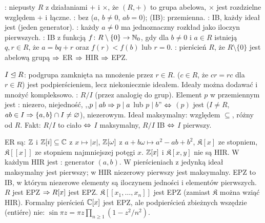 :  niepusty $R$ z działaniami $+$ i $\times$, że $(R,+)$ to grupa abelowa, $\times$ jest rozdzielne względem $+$ i łączne.
: bez  ($a$, $b \neq 0$, $ab = 0$);  (IB): przemienna.
: IB, każdy ideał jest  (jeden generator).
: każdy $a \neq 0$ ma jednoznaczny rozkład jako iloczyn pierwszych.
: IB z funkcją $f \colon R \setminus \{0\} \to \mathbb N_0$, gdy dla $b \neq 0$ i $a \in R$ istnieją $q, r \in R$, że $a = bq+r$ oraz $f(r) < f(b)$ lub $r = 0$.
: pierścień $R$, że $R \setminus \{0\}$ jest abelową grupą $\Rightarrow$ ER $\Rightarrow$ HIR $\Rightarrow$ EPZ.

 $I \trianglelefteq R$: podgrupa zamknięta na mnożenie przez $r \in R$.
 ($c \in R$, że $cr = rc$ dla $r \in R$) jest podpierścieniem, lecz niekoniecznie ideałem.
Ideały można dodawać i mnożyć kompleksowo.
: $R/I$ (przez analogię do grup).
Element $p$ w przemiennym jest : niezero, niejedność, ,,$p \mid ab \Rightarrow p \mid a$ lub $p \mid b$'' $\Leftrightarrow$ $(p)$ jest  ($I \neq R$, $ab \in I \Rightarrow \{a,b\} \cap I \neq \varnothing$), niezerowym.
Ideał maksymalny: względem $\subseteq$, różny od $R$.
Fakt: $R/I$ to ciało $\Leftrightarrow$ $I$ maksymalny, $R/I$ IB $\Leftrightarrow$ $I$ pierwszy.

ER są: $\mathbb{Z}$ i $\mathbb{Z}[i] \subseteq \mathbb{C}$ z $x \mapsto |x|$, $\mathbb{Z}[\omega]$ z $a + b\omega \mapsto a^2-ab+b^2$, $\mathfrak K[x]$ ze stopniem, $\mathfrak K[[x]]$ ze stopniem najmniejszej potęgi $x$. 
$\mathbb{Z}[x]$ i $\mathfrak K[x,y]$ nie są HIR.
W każdym HIR jest : generator $(a,b)$.
W pierścieniach z jedynką ideał maksymalny jest pierwszy; w HIR niezerowy pierwszy jest maksymalny.
EPZ to IB, w którym niezerowe elementy są iloczynem jedności i elementów pierwszych.
$R$ jest EPZ $\Rightarrow R[x]$ jest EPZ.
$\mathfrak K[[x_1, \ldots, x_n]]$ jest EPZ (zamiast $\mathfrak K$ można wziąć HIR).
Formalny pierścień $\mathbb{C}[x]$ jest EPZ, ale podpierścień zbieżnych wszędzie (entiére) nie: $\sin \pi z = \pi z \prod_{n \ge 1} (1 - z^2/n^2)$.